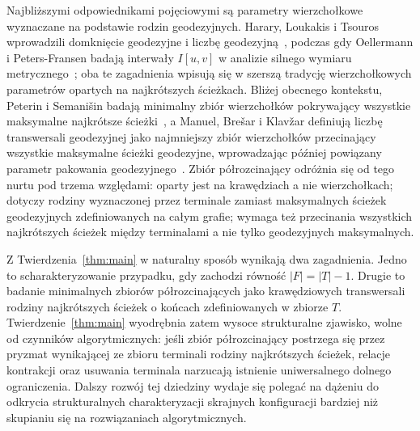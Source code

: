 \documentclass[11pt,a4paper]{amsart}
\theoremstyle{definition}
\theoremstyle{plain}
\begin{document}
Najbliższymi odpowiednikami pojęciowymi są parametry wierzchołkowe wyznaczane na podstawie rodzin geodezyjnych. Harary, Loukakis i Tsouros wprowadzili domknięcie geodezyjne i liczbę geodezyjną~\cite{harary-loukakis-tsouros}, podczas gdy Oellermann i Peters-Fransen badają interwały $I[u,v]$ w analizie silnego wymiaru metrycznego~\cite{oellermann-peters-fransen}; oba te zagadnienia wpisują się w szerszą tradycję wierzchołkowych parametrów opartych na najkrótszych ścieżkach. Bliżej obecnego kontekstu, Peterin i Semani\v{s}in badają minimalny zbiór wierzchołków pokrywający wszystkie maksymalne najkrótsze ścieżki~\cite{peterin-semanisin}, a Manuel, Bre\v{s}ar i Klav\v{z}ar definiują liczbę transwersali geodezyjnej jako najmniejszy zbiór wierzchołków przecinający wszystkie maksymalne ścieżki geodezyjne, wprowadzając później powiązany parametr pakowania geodezyjnego~\cite{manuel-bresar-klavzar-transversal,manuel-bresar-klavzar-packing}. Zbiór półrozcinający odróżnia się od tego nurtu pod trzema względami: oparty jest na krawędziach a nie wierzchołkach; dotyczy rodziny wyznaczonej przez terminale zamiast maksymalnych ścieżek geodezyjnych zdefiniowanych na całym grafie; wymaga też przecinania wszystkich najkrótszych ścieżek między terminalami a nie tylko geodezyjnych maksymalnych.

Z Twierdzenia~\ref{thm:main} w naturalny sposób wynikają dwa zagadnienia. Jedno to scharakteryzowanie przypadku, gdy zachodzi równość $|F|=|T|-1$. Drugie to badanie minimalnych zbiorów półrozcinających jako krawędziowych transwersali rodziny najkrótszych ścieżek o końcach zdefiniowanych w zbiorze $T$.
Twierdzenie~\ref{thm:main} wyodrębnia zatem wysoce strukturalne zjawisko, wolne od czynników algorytmicznych: jeśli zbiór półrozcinający postrzega się przez pryzmat wynikającej ze zbioru terminali rodziny najkrótszych ścieżek, relacje kontrakcji oraz usuwania terminala narzucają istnienie uniwersalnego dolnego ograniczenia. Dalszy rozwój tej dziedziny wydaje się polegać na dążeniu do odkrycia strukturalnych charakteryzacji skrajnych konfiguracji bardziej niż skupianiu się na rozwiązaniach algorytmicznych.
\end{document}
